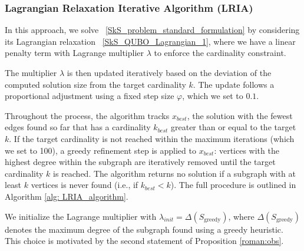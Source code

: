 \documentclass{article}
\begin{document}

\subsubsection{Lagrangian Relaxation Iterative Algorithm (LRIA)}


In this approach, we solve ~\eqref{SkS_problem_standard_formulation} by considering its Lagrangian relaxation ~\eqref{SkS_QUBO_Lagrangian_1}, where we have a linear penalty term with Lagrange multiplier $\lambda$ to enforce the cardinality constraint. 

The multiplier $\lambda$ is then updated iteratively based on the deviation of the computed solution size from the target cardinality $k$. The update follows a proportional adjustment using a fixed step size $\varphi$, which we set to $0.1$. 

Throughout the process, the algorithm tracks $x_{best}$, the solution with the fewest edges found so far that has a cardinality $k_{best}$ greater than or equal to the target $k$. If the target cardinality is not reached within the maximum iterations (which we set to 100), a greedy refinement step is applied to $x_{best}$: vertices with the highest degree within the subgraph are iteratively removed until the target cardinality $k$ is reached. The algorithm returns no solution if a subgraph with at least $k$ vertices is never found (i.e., if $k_{best} < k$). The full procedure is outlined in Algorithm \ref{alg: LRIA_algorithm}.

We initialize the Lagrange multiplier with $\lambda_{init} = \Delta(S_{\text{greedy}})$, where $\Delta(S_{\text{greedy}})$ denotes the maximum degree of the subgraph found using a greedy heuristic. This choice is motivated by the second statement  of  Proposition \ref{roman:obs}. 
\end{document}
